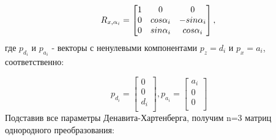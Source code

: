 \begin{equation}\label{eq:model}
R_{x, \alpha_i} = 
     \begin{bmatrix}
    1 & 0 & 0\\
    0 & cos\alpha_i & -sin\alpha_i\\
    0 & sin\alpha_i & cos\alpha_i\\
    \end{bmatrix}
    , \\
\end{equation} 
где  $p_{d_i}$ и $p_{a_i}$ - векторы с ненулевыми компонентами $p_z= d_i$ и $p_x= a_i$, соответственно:

\begin{equation}\label{eq:model}
 p_{d_i} = 
     \begin{bmatrix}
   0\\
   0\\
   d_i\\
    \end{bmatrix}
, p_{a_i} =
     \begin{bmatrix}
   a_i\\
   0\\
   0\\
    \end{bmatrix}
\end{equation}
Подставив все параметры Денавита-Хартенберга, получим n=3 матриц однородного преобразования: